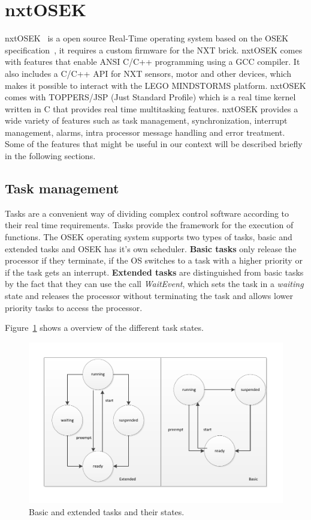 \section{nxtOSEK}
nxtOSEK~\cite{osek_os} is a open source Real-Time operating system based on the OSEK specification~\cite{osek_spec}, it requires a custom firmware for the NXT brick.
nxtOSEK comes with features that enable ANSI C/C++ programming using a GCC compiler. It also includes a C/C++ API for NXT sensors, motor and other devices, which makes it possible to interact with the LEGO MINDSTORMS platform. nxtOSEK comes with TOPPERS/JSP (Just Standard Profile) which is a real time kernel written in C that provides real time multitasking features.
nxtOSEK provides a wide variety of features such as task management, synchronization, interrupt management, alarms, intra processor message handling and error treatment. Some of the features that might be useful in our context will be described briefly in the following sections.

\subsection{Task management} %
\label{sub:task_management}
Tasks are a convenient way of dividing complex control software according to their real time requirements. Tasks provide the framework for the execution of functions. 
The OSEK operating system supports two types of tasks, basic and extended tasks and OSEK has it's own scheduler.
\textbf{Basic tasks} only release the processor if they terminate, if the OS switches to a task with a higher priority or if the task gets an interrupt.
\textbf{Extended tasks} are distinguished from basic tasks by the fact that they can use the call \emph{WaitEvent}, which sets the task in a \emph{waiting} state and releases the processor without terminating the task and allows lower priority tasks to access the processor.


Figure~\ref{taskstate} shows a overview of the different task states.

\begin{figure}[hptb]
  \centering
    \includegraphics[width=1.0\textwidth]{img/taskstate.pdf}
  \caption{Basic and extended tasks and their states.}
  \label{taskstate}
\end{figure}

